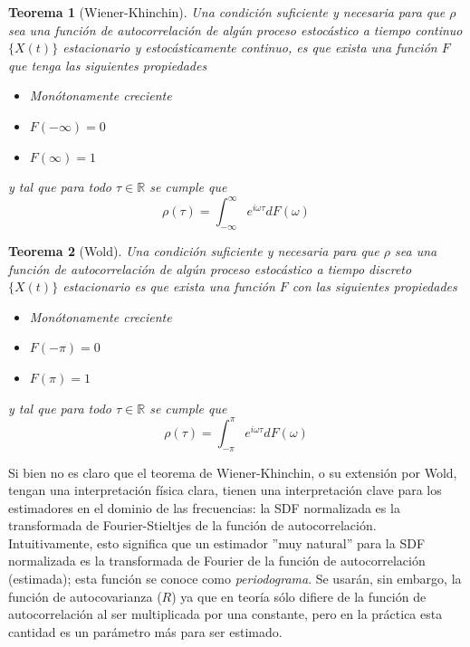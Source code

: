 \documentclass[12pt,a4paper]{mitthesis}
\newtheorem{thrm}{Teorema}
\newcommand{\R}{\mathbb{R}}
\newcommand{\intR}{\int_{-\infty}^{\infty}}
\newcommand{\intPI}{\int_{-\pi}^{\pi}}
\begin{document}
\begin{thrm}[Wiener-Khinchin]
Una condici\'on suficiente y necesaria para que $\rho$ sea una funci\'on de autocorrelaci\'on de 
alg\'un proceso estoc\'astico a tiempo continuo $\{X(t)\}$ estacionario y estoc\'asticamente 
continuo, es que exista una funci\'on $F$ que tenga las siguientes propiedades
\begin{itemize}
\item Monótonamente creciente
\item $F(-\infty) = 0$
\item $F(\infty) = 1$
\end{itemize}
y tal que para todo $\tau \in \R$ se cumple que
\begin{equation*}
\rho(\tau) = \intR e^{i \omega \tau} dF(\omega)
\end{equation*}
\end{thrm}

\begin{thrm}[Wold]
Una condici\'on suficiente y necesaria para que $\rho$ sea una funci\'on de autocorrelaci\'on de 
alg\'un proceso estoc\'astico a tiempo discreto $\{X(t)\}$ estacionario es que exista una funci\'on 
$F$ con las siguientes propiedades
\begin{itemize}
\item Monótonamente creciente
\item $F(-\pi) = 0$
\item $F(\pi) = 1$
\end{itemize}
y tal que para todo $\tau \in \R$ se cumple que
\begin{equation*}
\rho(\tau) = \intPI e^{i \omega \tau} dF(\omega)
\end{equation*}
\end{thrm}

Si bien no es claro que el teorema de Wiener-Khinchin, o su extensi\'on por Wold, tengan una 
interpretaci\'on f\'isica clara, tienen una interpretaci\'on clave para los estimadores en el 
dominio de las frecuencias: la SDF normalizada es la transformada de Fourier-Stieltjes de la 
funci\'on de autocorrelaci\'on.
Intuitivamente, esto significa que un estimador ''muy natural'' para la SDF normalizada es la 
transformada de Fourier de la funci\'on de autocorrelaci\'on (estimada); esta funci\'on se conoce 
como \textit{periodograma}. Se usar\'an, sin embargo, la funci\'on de autocovarianza ($R$) ya que 
en teor\'ia s\'olo difiere de la funci\'on de autocorrelaci\'on al ser multiplicada por una 
constante, pero en la pr\'actica esta cantidad es un par\'ametro m\'as para ser estimado.
\end{document}
